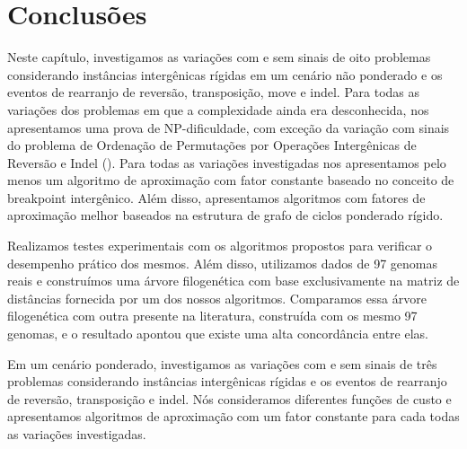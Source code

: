 \section{Conclusões}

Neste capítulo, investigamos as variações com e sem sinais de oito problemas considerando instâncias intergênicas rígidas em um cenário não ponderado e os eventos de rearranjo de reversão, transposição, move e indel. Para todas as variações dos problemas em que a complexidade ainda era desconhecida, nos apresentamos uma prova de NP-dificuldade, com exceção da variação com sinais do problema de Ordenação de Permutações por Operações Intergênicas de Reversão e Indel (\SbIRI). Para todas as variações investigadas nos apresentamos pelo menos um algoritmo de aproximação com fator constante baseado no conceito de breakpoint intergênico. Além disso, apresentamos algoritmos com fatores de aproximação melhor baseados na estrutura de grafo de ciclos ponderado rígido.

Realizamos testes experimentais com os algoritmos propostos para verificar o desempenho prático dos mesmos. Além disso, utilizamos dados de 97 genomas reais e construímos uma árvore filogenética com base exclusivamente na matriz de distâncias fornecida por um dos nossos algoritmos. Comparamos essa árvore filogenética com outra presente na literatura, construída com os mesmo 97 genomas, e o resultado apontou que existe uma alta concordância entre elas.

Em um cenário ponderado, investigamos as variações com e sem sinais de três problemas considerando instâncias intergênicas rígidas e os eventos de rearranjo de reversão, transposição e indel. Nós consideramos diferentes funções de custo e apresentamos algoritmos de aproximação com um fator constante para cada todas as variações investigadas.